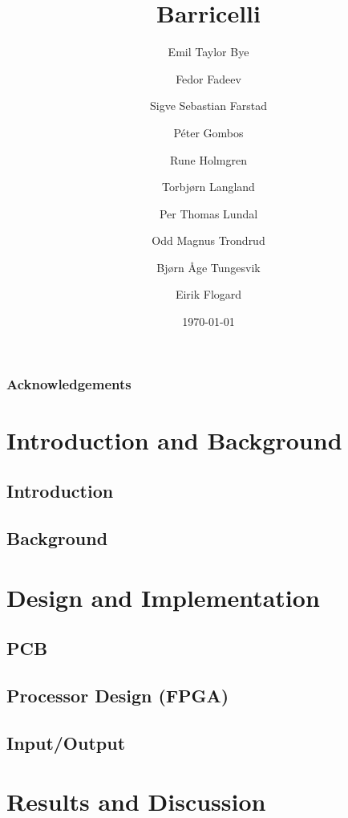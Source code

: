 \documentclass{report}
\title{Barricelli}
\date{\today}
\author{Emil Taylor Bye
     \and Fedor Fadeev
     \and Sigve Sebastian Farstad
     \and Péter Gombos
     \and Rune Holmgren
     \and Torbjørn Langland
     \and Per Thomas Lundal
     \and Odd Magnus Trondrud
     \and Bjørn Åge Tungesvik
     \and Eirik Flogard
}
\begin{document}


\maketitle

\begin{abstract}
	
\end{abstract}


\tableofcontents

\section{Acknowledgements}

\part{Introduction and Background}

\chapter{Introduction}
	

\chapter{Background}
	

\part{Design and Implementation}

\chapter{PCB}
	

\chapter{Processor Design (FPGA)}
	

\chapter{Input/Output}
	

\part{Results and Discussion}
\end{document}
